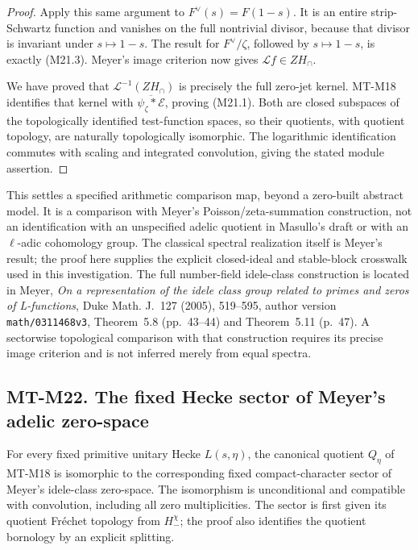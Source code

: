 \begin{proof}
Apply this same argument to \(F^\vee(s)=F(1-s)\).
It is an entire strip-Schwartz function and vanishes on
the full nontrivial divisor, because that divisor is
invariant under \(s\mapsto1-s\). The result for
\(F^\vee/\zeta\), followed by \(s\mapsto1-s\),
is exactly (M21.3). Meyer's image criterion now gives
\(\mathcal Lf\in ZH_\cap\).

We have proved that \(\mathcal L^{-1}(ZH_\cap)\)
is precisely the full zero-jet kernel. MT-M18 identifies
that kernel with \(\overline{\psi_\zeta*\mathcal E}\),
proving (M21.1). Both are closed subspaces of the
topologically identified test-function spaces, so their
quotients, with quotient topology, are naturally
topologically isomorphic. The logarithmic identification
commutes with scaling and integrated convolution, giving
the stated module assertion.
\end{proof}

This settles a specified arithmetic comparison map, beyond
a zero-built abstract model. It is a comparison with
Meyer's Poisson/zeta-summation construction, not an
identification with an unspecified adelic quotient in
Masullo's draft or with an \(\ell\)-adic cohomology group.
The classical spectral realization itself is Meyer's
result; the proof here supplies the explicit closed-ideal
and stable-block crosswalk used in this investigation.
The full number-field idele-class construction is located
in Meyer, \emph{On a representation of the idele class
group related to primes and zeros of L-functions},
Duke Math. J.~127 (2005), 519--595, author version
\texttt{math/0311468v3}, Theorem~5.8 (pp.~43--44) and
Theorem~5.11 (p.~47). A sectorwise topological comparison
with that construction requires its precise image
criterion and is not inferred merely from equal spectra.


\subsection*{MT-M22. The fixed Hecke sector of Meyer's adelic zero-space}

For every fixed primitive unitary Hecke \(L(s,\eta)\), the
canonical quotient \(Q_\eta\) of MT-M18 is isomorphic to the
corresponding fixed compact-character sector of Meyer's
idele-class zero-space.  The isomorphism is unconditional
and compatible with convolution, including all zero
multiplicities.  The sector is first given its quotient
Fr\'echet topology from \(H_-^\chi\); the proof also
identifies the quotient bornology by an explicit splitting.

